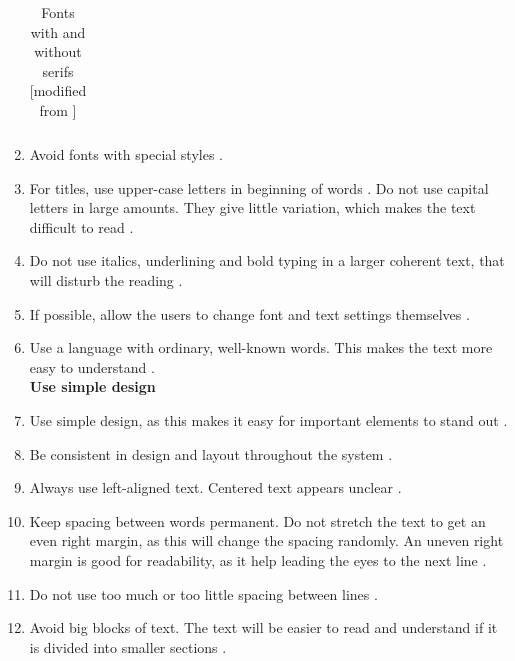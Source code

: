 \begin{enumerate}[{g}.1]
\begin{table}
\begin{tabular}{ l p{8cm} }
\end{tabular}
\caption[Fonts]{Fonts with and without serifs [modified from \cite{blindeforbundetTekst}]}
\label{tab:fonts}
\end{table}
\item Avoid fonts with special styles \cite{blindeforbundetTekst} \cite{actionforblindpeopleTekst}.
\item For titles, use upper-case letters in beginning of words \cite{actionforblindpeopleTekst}. Do not use capital letters in large amounts. They give little variation, which makes the text difficult to read \cite{blindeforbundetTekst}. 
\item Do not use italics, underlining and bold typing in a larger coherent text, that will disturb the reading \cite{blindeforbundetTekst} \cite{actionforblindpeopleTekst}.  
\item If possible, allow the users to change font and text settings themselves \cite{blindeforbundetTekst} \cite{w3cTekst}. 
\item Use a language with ordinary, well-known words. This makes the text more easy to understand \cite{w3cTekst}. \\ 


\textbf{Use simple design}

\item Use simple design, as this makes it easy for important elements to stand out \cite{actionforblindpeopleTekst}.
\item Be consistent in design and layout throughout the system \cite{actionforblindpeopleTekst}.
\item Always use left-aligned text. Centered text appears unclear \cite{actionforblindpeopleTekst}.  
\item Keep spacing between words permanent. Do not stretch the text to get an even right margin, as this will change the spacing randomly. An uneven right margin is good for readability, as it help leading the eyes to the next line \cite{blindeforbundetTekst} \cite{actionforblindpeopleTekst}.
\item Do not use too much or too little spacing between lines \cite{blindeforbundetTekst} \cite{actionforblindpeopleTekst}. 
\item Avoid big blocks of text. The text will be easier to read and understand if it is divided into smaller sections \cite{blindeforbundetTekst} \cite{actionforblindpeopleTekst}. \\  



\end{enumerate}
